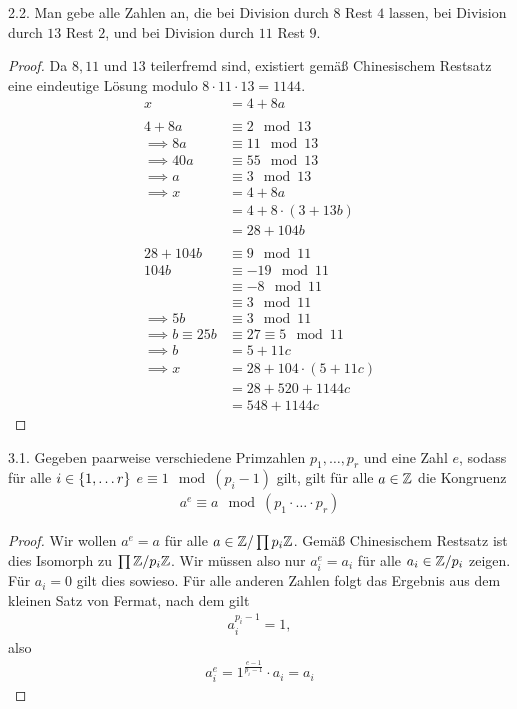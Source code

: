 \documentclass{article}
\newcommand{\ex}[1]{\tit{Übung} #1.}
\begin{document}
		\newpar
		\ex{2.2} Man gebe alle Zahlen an, die bei Division durch $8$ Rest $4$ lassen, bei Division durch $13$ Rest $2$, und bei Division durch $11$ Rest $9$.
		\begin{proof}
			Da $8,11$ und $13$ teilerfremd sind, existiert gemäß Chinesischem Restsatz eine eindeutige Lösung modulo $8 \cdot 11 \cdot 13 = 1144$.
			\begin{align*}
				x &= 4 + 8a\\\\
				4 + 8a &\equiv 2 \mod 13\\
				\implies 8a &\equiv 11 \mod 13\\
				\implies 40a &\equiv 55 \mod 13\\
				\implies a &\equiv 3 \mod 13\\
				\implies x 
				&= 4 + 8a\\
				&= 4 + 8 \cdot (3 + 13b)\\
				&= 28 + 104b\\\\
				28 + 104b &\equiv 9 \mod 11\\
				104b &\equiv -19 \mod 11\\
				&\equiv -8 \mod 11\\
				&\equiv 3 \mod 11\\
				\implies 5b &\equiv 3 \mod 11\\
				\implies b \equiv 25b &\equiv 27 \equiv 5 \mod 11\\
				\implies b &= 5 + 11c\\
				\implies x &= 28 + 104 \cdot (5 + 11c)\\
				&= 28 + 520 + 1144c\\
				&= 548 + 1144c
			\end{align*}
		\end{proof}
		\newpar
		\ex{3.1}  Gegeben paarweise verschiedene Primzahlen $p_1, \hdots, p_r$ und eine Zahl $e$, sodass für alle $i \in \qty{1, \hdots r}$  $e \equiv 1 \mod (p_i-1)$ gilt, gilt für alle $a \in \mathbb{Z}$ die Kongruenz
		\begin{align*}
			a^e \equiv a \mod (p_1 \cdot \hdots \cdot p_r)
		\end{align*}
		\begin{proof}
			Wir wollen $a^e = a$ für alle $a \in \mathbb{Z}/\prod p_i \mathbb{Z}$. Gemäß Chinesischem Restsatz ist dies Isomorph zu $\prod \mathbb{Z}/p_i \mathbb{Z}$. Wir müssen also nur $a_i^e = a_i$ für alle $a_i \in \mathbb{Z}/p_i$ zeigen. Für $a_i = 0$ gilt dies sowieso. Für alle anderen Zahlen folgt das Ergebnis aus dem kleinen Satz von Fermat, nach dem gilt
			\begin{align*}
				a_i^{p_i - 1} = 1,
			\end{align*}
			also
			\begin{align*}
				a_i^e = 1^\frac{e-1}{p_i - 1} \cdot a_i = a_i
			\end{align*}
		\end{proof}
\end{document}
